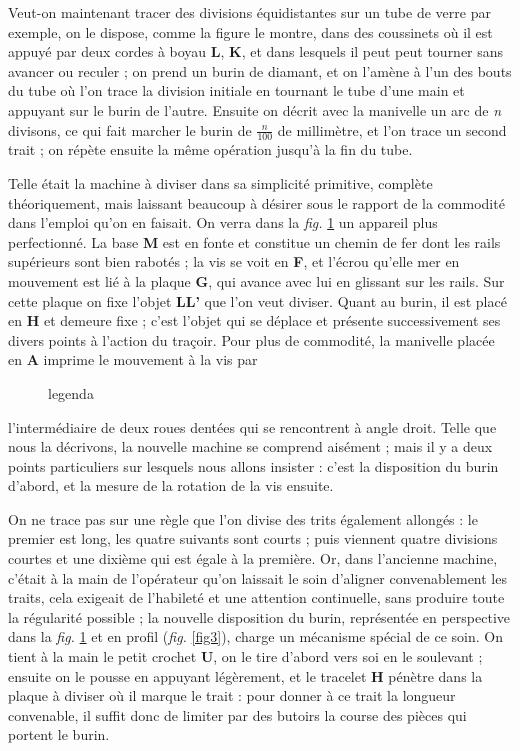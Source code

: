 \documentclass[a4paper, 12pt]{article} %
\begin{document}
Veut-on maintenant tracer des divisions équidistantes sur un tube de verre par exemple, on le dispose, comme la figure le montre, dans des coussinets où il est appuyé par deux cordes à boyau \textbf{L}, \textbf{K}, et dans lesquels il peut peut tourner sans avancer ou reculer ; on prend un burin de diamant, et on l'amène à l'un des bouts du tube où l'on trace la division initiale en tournant le tube d'une main et appuyant sur le burin de l'autre. Ensuite on décrit avec la manivelle un arc de \textit{n} divisons, ce qui fait marcher le burin de $\frac{n}{100}$ de millimètre, et l'on trace un second trait ; on répète ensuite la même opération jusqu'à la fin du tube.

Telle était la machine à diviser dans sa simplicité primitive, complète théoriquement, mais laissant beaucoup à désirer sous le rapport de la commodité dans l'emploi qu'on en faisait. On verra dans la \textit{fig.} \ref{fig2} un appareil plus perfectionné. La base \textbf{M} est en fonte et constitue un chemin de fer dont les rails supérieurs sont bien rabotés ; la vis se voit en \textbf{F}, et l'écrou qu'elle mer en mouvement est lié à la plaque \textbf{G}, qui avance avec lui en glissant sur les rails. Sur cette plaque on fixe l'objet \textbf{LL'} que l'on veut diviser. Quant au burin, il est placé en \textbf{H} et demeure fixe ; c'est l'objet qui se déplace et présente successivement ses divers points à l'action du traçoir. Pour plus de commodité, la manivelle placée en \textbf{A} imprime le mouvement à la vis par

\begin{figure}[H]
	\begin{center}
	\end{center}
	\caption{legenda}
	\label{fig2}
\end{figure}

l'intermédiaire de deux roues dentées qui se rencontrent à angle droit. Telle que nous la décrivons, la nouvelle machine se comprend aisément ; mais il y a deux points particuliers sur lesquels nous allons insister : c'est la disposition du burin d'abord, et la mesure de la rotation de la vis ensuite.

On ne trace pas sur une règle que l'on divise des trits également allongés : le premier est long, les quatre suivants sont courts ; puis viennent quatre divisions courtes et une dixième qui est égale à la première. Or, dans l'ancienne machine, c'était à la main de l'opérateur qu'on laissait le soin d'aligner convenablement les traits, cela exigeait de l'habileté et une attention continuelle, sans produire toute la régularité possible ; la nouvelle disposition du burin, représentée en perspective dans la \textit{fig.} \ref{fig2} et en profil (\textit{fig.} \ref{fig3}), charge un mécanisme spécial de ce soin. On tient à la main le petit crochet \textbf{U}, on le tire d'abord vers soi en le soulevant ; ensuite on le pousse en appuyant légèrement, et le tracelet \textbf{H} pénètre dans la plaque à diviser où il marque le trait : pour donner à ce trait la longueur convenable, il suffit donc de limiter par des butoirs la course des pièces qui portent le burin.
\end{document}
